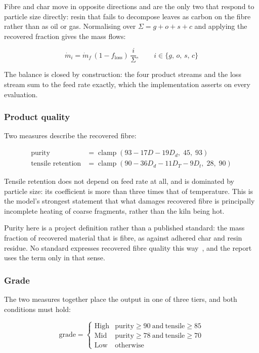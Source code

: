 Fibre and char move in opposite directions and are the only two that respond to particle size directly: resin that fails to decompose leaves as carbon on the fibre rather than as oil or gas. Normalising over $\Sigma = g+o+s+c$ and applying the recovered fraction gives the mass flows:

\begin{equation}
  \dot{m}_i = \dot{m}_f \,(1 - f_{\text{loss}})\, \frac{i}{\Sigma},
  \qquad i \in \{g,\, o,\, s,\, c\}
  \label{eq:flows}
\end{equation}

The balance is closed by construction: the four product streams and the loss stream sum to the feed rate exactly, which the implementation asserts on every evaluation.

\subsubsection{Product quality}

Two measures describe the recovered fibre:

\begin{align}
  \text{purity} &= \operatorname{clamp}(93 - 17D - 19D_{d},\; 45,\; 93) \\
  \text{tensile retention} &= \operatorname{clamp}(90 - 36D_{d} - 11D_T - 9D_{t},\; 28,\; 90)
  \label{eq:quality}
\end{align}

Tensile retention does not depend on feed rate at all, and is dominated by particle size: its coefficient is more than three times that of temperature. This is the model's strongest statement that what damages recovered fibre is principally incomplete heating of coarse fragments, rather than the kiln being hot.

Purity here is a project definition rather than a published standard: the mass fraction of recovered material that is fibre, as against adhered char and resin residue. No standard expresses recovered fibre quality this way~\cite{pas101}, and the report uses the term only in that sense.

\subsubsection{Grade}

The two measures together place the output in one of three tiers, and both conditions must hold:

\begin{equation}
  \text{grade} =
  \begin{cases}
    \text{High} & \text{purity} \ge 90 \ \text{and}\ \text{tensile} \ge 85\\
    \text{Mid}  & \text{purity} \ge 78 \ \text{and}\ \text{tensile} \ge 70\\
    \text{Low}  & \text{otherwise}
  \end{cases}
  \label{eq:grade}
\end{equation}

